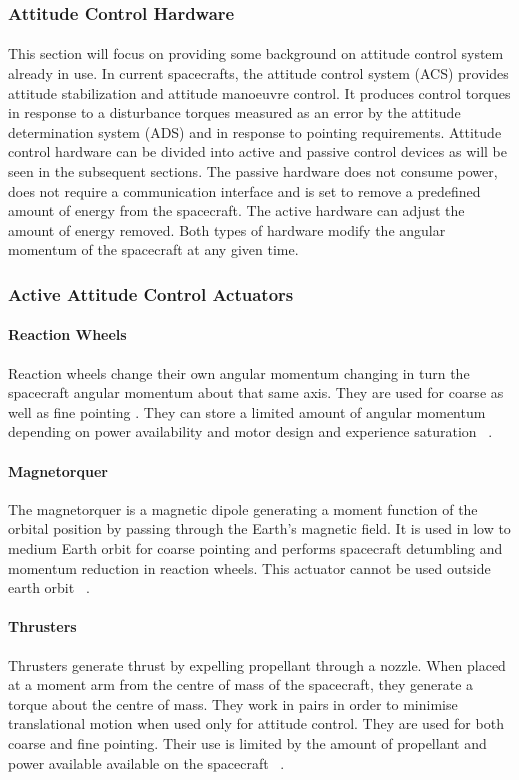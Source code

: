\subsubsection{Attitude Control Hardware}
\paragraph{}This section will focus on providing some background on attitude control system already in use. In current spacecrafts, the attitude control system (ACS) provides attitude stabilization and attitude manoeuvre control. It produces control torques in response to a disturbance torques measured as an error by the attitude determination system (ADS) and in response to pointing requirements. Attitude control hardware can be divided into active and passive control devices as will be seen in the subsequent sections. The passive hardware does not consume power, does not require a communication interface and is set to remove a predefined amount of energy from the spacecraft. The active hardware can adjust the amount of energy removed. Both types of hardware modify the angular momentum of the spacecraft at any given time. 
\subsubsection{Active Attitude Control Actuators}
\paragraph{Reaction Wheels}Reaction wheels change their own angular momentum changing in turn the spacecraft angular momentum about that same axis. They are used for coarse as well as fine pointing . They can store a limited amount of angular momentum depending on power availability and motor design and experience saturation ~\cite{Lukaszynski2013}.
\paragraph{Magnetorquer}The magnetorquer is a magnetic dipole generating a moment function of the orbital position by passing through the Earth’s magnetic field. It is used in low to medium Earth orbit for coarse pointing and performs spacecraft detumbling and momentum reduction in reaction wheels. This actuator cannot be used outside earth orbit ~\cite{Lukaszynski2013}. 
\paragraph{Thrusters}Thrusters generate thrust by expelling propellant through a nozzle. When placed at a moment arm from the centre of mass of the spacecraft, they generate a torque about the centre of mass.  They work in pairs in order to minimise translational motion when used only for attitude control. They are used for both coarse and fine pointing. Their use is limited by the amount of propellant and power available available on the spacecraft ~\cite{Lukaszynski2013}.  
